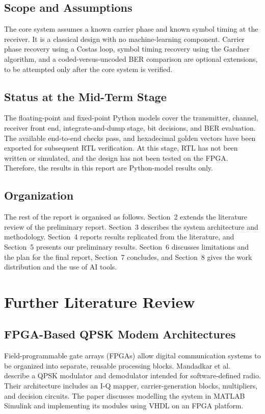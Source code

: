 \documentclass[10pt,twocolumn,letterpaper]{article}
\begin{document}
\subsection{Scope and Assumptions}

The core system assumes a known carrier phase and known symbol timing at the receiver. It is a classical design with no machine-learning component. Carrier phase recovery using a Costas loop, symbol timing recovery using the Gardner algorithm, and a coded-versus-uncoded BER comparison are optional extensions, to be attempted only after the core system is verified.

\subsection{Status at the Mid-Term Stage}
The floating-point and fixed-point Python models cover the transmitter, channel, receiver front end, integrate-and-dump stage, bit decisions, and BER evaluation. The available end-to-end checks pass, and hexadecimal golden vectors have been exported for subsequent RTL verification. At this stage, RTL has not been written or simulated, and the design has not been tested on the FPGA. Therefore, the results in this report are Python-model results only.

\subsection{Organization}

The rest of the report is organised as follows. Section~2 extends the literature review of the preliminary report. Section~3 describes the system architecture and methodology. Section~4 reports results replicated from the literature, and Section~5 presents our preliminary results. Section~6 discusses limitations and the plan for the final report, Section~7 concludes, and Section~8 gives the work distribution and the use of AI tools.

\section{Further Literature Review}

\subsection{FPGA-Based QPSK Modem Architectures}
Field-programmable gate arrays (FPGAs) allow digital communication systems to be organized into separate, reusable processing blocks. Mandadkar et al.~\cite{mandadkar2014qpsk} describe a QPSK modulator and demodulator intended for software-defined radio. Their architecture includes an I-Q mapper, carrier-generation blocks, multipliers, and decision circuits. The paper discusses modelling the system in MATLAB Simulink and implementing its modules using VHDL on an FPGA platform.
\end{document}
